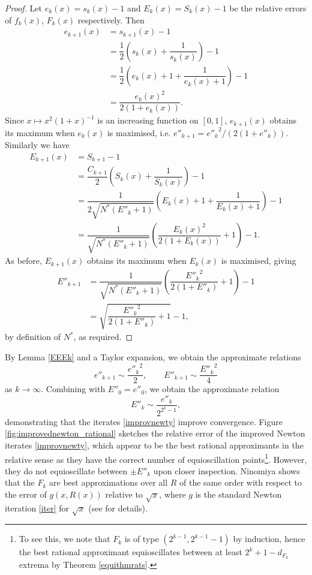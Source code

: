 \begin{proof}
Let $e_k(x)=s_k(x)-1$ and $E_k(x)=S_k(x)-1$ be the relative errors of $f_k(x)$, $F_k(x)$ respectively. Then
\begin{align*}
    e_{k+1}(x) &= s_{k+1}(x)-1 \\
    & = \dfrac{1}{2}\left(s_k(x)+\dfrac{1}{s_k(x)}\right) -1\\
    & = \dfrac{1}{2}\left(e_k(x)+1+\dfrac{1}{e_k(x)+1}\right) -1\\
    &=\dfrac{e_k(x)^2}{2(1+e_k(x))}.
\end{align*}
Since $x \mapsto x^2(1+x)^{-1}$ is an increasing function on $[0,1]$, $e_{k+1}(x)$ obtains its maximum when $e_k(x)$ is maximised, i.e. $e''_{k+1}={e''_k}^2/(2(1+e''_k))$. Similarly we have
\begin{align*}
    E_{k+1}(x) & =S_{k+1}-1 \\
    &=\dfrac{C_{k+1}}{2}\left(S_k(x)+\dfrac{1}{S_k(x)}\right) -1 \\
    &=\dfrac{1}{2\sqrt{N^*(E''_k+1)}}\left(E_k(x)+1+\dfrac{1}{E_k(x)+1}\right) -1 \\
    &=\dfrac{1}{\sqrt{N^*(E''_k+1)}}\left(\dfrac{E_k(x)^2}{2(1+E_k(x))}+1\right)-1.
\end{align*}
As before, $E_{k+1}(x)$ obtains its maximum when $E_k(x)$ is maximised, giving
\begin{align*}
    E''_{k+1}&=\dfrac{1}{\sqrt{N^*(E''_k+1)}}\left(\dfrac{{E''_k}^2}{2(1+E''_k)}+1\right)-1 \\
    &= \sqrt{\dfrac{{E''_k}^2}{2(1+E''_k)}+1}-1,
\end{align*}
by definition of $N^*$, as required.
\end{proof}

By Lemma \ref{EEEk} and a Taylor expansion, we obtain the approximate relations
\[e''_{k+1} \sim \dfrac{{e''_k}^2}{2}, \qquad E''_{k+1} \sim \dfrac{{E''_k}^2}{4}\]
as $k\to\infty$. Combining with $E''_0=e''_0$, we obtain the approximate relation
\[E''_k \sim \dfrac{e''_k}{2^{2^k-1}},\]
demonstrating that the iterates \eqref{improvnewty} improve convergence. Figure \ref{fig:improvednewton_rational} sketches the relative error of the improved Newton iterates \eqref{improvnewty}, which appear to be the best rational approximants in the relative sense as they have the correct number of equioscillation points\footnote{To see this, we note that $F_k$ is of type $(2^{k-1},2^{k-1}-1)$ by induction, hence the best rational approximant equioscillates between at least $2^k+1-d_{F_k}$ extrema by Theorem \ref{equithmrats}.}. However, they do not equioscillate between $\pm E''_k$ upon closer inspection. Ninomiya shows that the $F_k$ are best approximations over all $R$ of the same order with respect to the error of $g(x,R(x))$ relative to $\sqrt{x}$, where $g$ is the standard Newton iteration \eqref{iter} for $\sqrt{x}$ (see \cite[Theorem 4]{ninomiya1970best} for details). 

